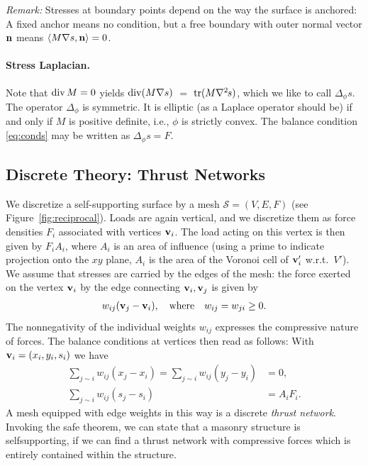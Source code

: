 \documentclass[review]{acmsiggraph}
\def\<{\mathchoice{\big\langle}{\langle}{\langle}{\langle}}
\def\>{\mathchoice{\big\rangle}{\rangle}{\rangle}{\rangle}}
\def\Div{\mathop{{\rm div}}\nolimits}
\def\tr{\mathop{{\rm tr}}\nolimits}
\def\ess{s}
\def\Hess#1{{\def\testess{#1}\nabla^2\ifx\testess\ess\!s\else #1\fi}}
\def\Hess#1{\text{$\nabla^2\hskip-.2ex #1$}}
\def\SS{{\mathcal S}}
\begin{document}
{\it Remark:} Stresses at boundary points depend on the way the surface is 
anchored: A fixed anchor means no condition, but a free boundary with 
outer normal vector ${\mathbf n}$ means $\<M \nabla s, \nw \> = 0$.


\paragraph{Stress Laplacian.} Note that $\Div M =0$ yields $\Div(M\nabla 
s)$ $ =$ $ \tr(M\Hess s)$, which we like to call $\Delta_\phi s$. The 
operator $\Delta_\phi$ is symmetric. It is elliptic (as a Laplace operator 
should be) if and only if $M$ is positive definite, i.e., $\phi$ is 
strictly convex. The balance condition \eqref{eq:conds} may be written as
	$
	\Delta_\phi s = F.
	$


\subsection{Discrete Theory: Thrust Networks}
\label{sec:thrustnetworks}

We discretize a self-supporting surface by a mesh $\SS=(V,E,F)$
(see Figure~\ref{fig:reciprocal}). Loads are again vertical, 
and we discretize them as force densities $F_i$ associated with vertices 
${\mathbf v}_i$. The load acting on this vertex is then given by $F_iA_i$, where 
$A_i$ is an area of influence (using a prime to indicate projection onto 
the $xy$ plane, $A_i$ is the area of the Voronoi cell of ${\mathbf v}_i'$ w.r.t.\ 
$V'$). We assume that stresses are carried by the edges of the mesh: the 
force exerted on the vertex ${\mathbf v}_i$ by the edge connecting ${\mathbf v}_i,{\mathbf v}_j$ 
is given by
	\begin{align*}
	w_{ij} ({\mathbf v}_j-{\mathbf v}_i),
	\quad
	\text{where}\quad
	w_{ij}=w_{ji}\ge 0.
	\end{align*}
 The nonnegativity of the individual weights $w_{ij}$ expresses the 
compressive nature of forces. The balance conditions at vertices then read 
as follows: With ${\mathbf v}_i=(x_i,y_i,s_i)$ we have
	\begin{align}
	\sum\nolimits_{j\sim i}
		w_{ij} (x_j - x_i)
	=
	\sum\nolimits_{j\sim i}
		w_{ij} (y_j - y_i) &= 0,
			 \label{eq:deqtop} \\
	\sum\nolimits_{j\sim i}
		w_{ij} (s_j - s_i)
		&= A_i F_i.
			\label{eq:deqz}
	\end{align}
 A mesh equipped with edge weights in this way is a discrete \emph{thrust
network}. Invoking the safe theorem, we can state that a masonry structure
is self\dash supporting, if we can find a thrust network with compressive
forces which is entirely contained within the structure.
\end{document}
